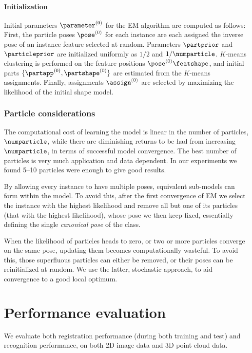 \paragraph{Initialization}
Initial parameters $\parameter^{(0)}$ for the EM algorithm are computed as follows: First, the particle poses $\pose^{(0)}$ for each instance are each assigned the inverse pose of an instance feature selected at random. Parameters $\partprior$ and $\particleprior$ are initialized uniformly as $1/2$ and $1/\numparticle$. $K$-means clustering is performed on the feature positions $\pose^{(0)}\featshape$, and initial parts $\{\partapp^{(0)}, \partshape^{(0)}\}$ are estimated from the $K$-means assignments. Finally, assignments $\assign^{(0)}$ are selected by maximizing the likelihood of the initial shape model.

\subsubsection{Particle considerations}
The computational cost of learning the model is linear in the number of particles, $\numparticle$, while there are diminishing returns to be had from increasing $\numparticle$, in terms of successful model convergence. The best number of particles is very much application and data dependent. In our experiments we found 5--10 particles were enough to give good results.

By allowing every instance to have multiple poses, equivalent sub-models can form within the model. To avoid this, after the first convergence of EM we select the instance with the highest likelihood and remove all but one of its particles (that with the highest likelihood), whose pose we then keep fixed, essentially defining the single \emph{canonical pose} of the class.

When the likelihood of particles heads to zero, or two or more particles converge on the same pose, updating them becomes computationally wasteful. To avoid this, those superfluous particles can either be removed, or their poses can be reinitialized at random. We use the latter, stochastic approach, to aid convergence to a good local optimum.


\section{Performance evaluation}
\label{sec:experiments}
We evaluate both registration performance (during both training and test) and recognition performance, on both 2D image data and 3D point cloud data.


